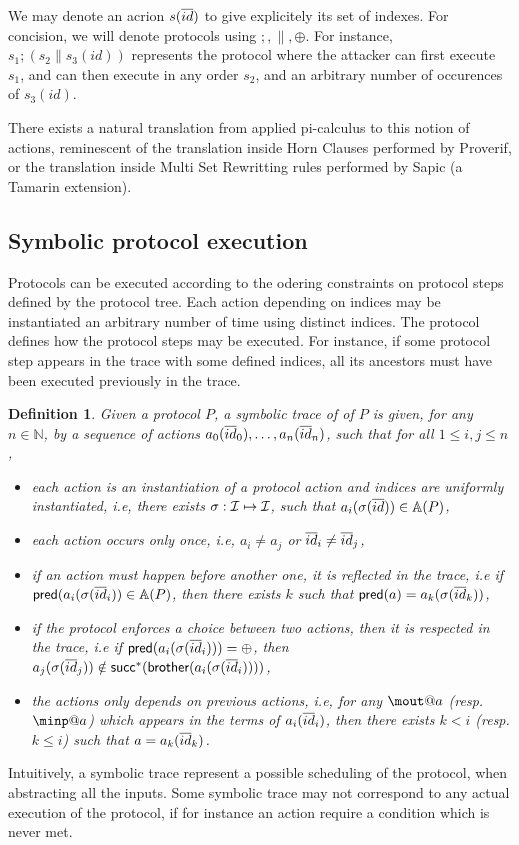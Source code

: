 \documentclass[a4paper]{article}
\newtheorem{definition}{Definition}
\theoremstyle{remark}
\begin{document}
We may denote an acrion $s(\overline{id})$ to give explicitely its set of indexes.
For concision, we will denote protocols using $;,\|,\oplus$. For instance, $s_1; (s_2 \| s_3(id))$ represents the protocol where the attacker can first execute $s_1$, and can then execute in any order $s_2$, and an arbitrary number of occurences of $s_3(id)$.

There exists a natural translation from applied pi-calculus to this notion of actions, reminescent of the translation inside Horn Clauses performed by Proverif, or the translation inside Multi Set Rewritting rules performed by Sapic (a Tamarin extension).

\subsection{Symbolic protocol execution}

Protocols can be executed according to the odering constraints on protocol steps defined by the protocol tree.
Each action depending on indices may be instantiated an arbitrary number of time using distinct indices. The protocol defines how the protocol steps may be executed. For instance, if some protocol step appears in
the trace with some defined indices, all its ancestors must have been executed previously in the trace.


\begin{definition}
  Given a protocol $P$, a symbolic trace of of $P$ is given, for any $n\in\mathbb{N}$, by a sequence of actions $a_0 (\overline{id}_0),\dots,a_n (\overline{id}_n)$, such that for all $1 \leq i,j \leq n$,
  \begin{itemize}
    \item each action is an instantiation of a protocol action and indices are uniformly instantiated, i.e, there exists $\sigma : \mathcal{I} \mapsto \mathcal{I}$, such that $a_i (\sigma (\overline{id})) \in\mathbb{A}(P)$,
    \item each action occurs only once, i.e, $a_i \neq{} a_j$ or $\overline{id}_i \neq\overline{id}_j$,
    \item if an action must happen before another one, it is reflected in the trace, i.e
      if $\textsf{pred} (a_i(\sigma(\overline{id}_i)) \in \mathbb{A}(P)$, then there exists $k$ such that $\textsf{pred}(a) = a_k(\sigma(\overline{id}_k))$,
    \item if the protocol enforces a choice between two actions, then it is respected in the trace, i.e if $\textsf{pred}(a_i(\sigma(\overline{id}_i))) = \oplus$, then $a_j(\sigma(\overline{id}_j)) \notin \textsf{succ}^*(\textsf{brother} (a_i(\sigma(\overline{id}_i))))$,
      \item the actions only depends on previous actions, i.e, for any $\mout@a$ (resp. $\minp@a$) which appears in the terms of $a_i(\overline{id}_i)$, then there exists $k < i$ (resp. $k \leq i$) such that $a = a_k(\overline{id}_k)$.
      \end{itemize}
\end{definition}
Intuitively, a symbolic trace represent a possible scheduling of the protocol, when abstracting all the inputs. Some symbolic trace may not correspond to any actual execution of the protocol, if for instance an action require a condition which is never met.
\end{document}
